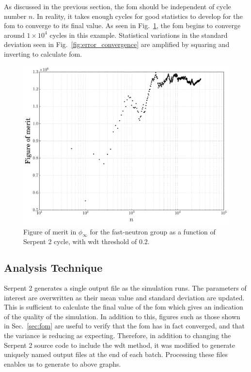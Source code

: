 As discussed in the previous section, the \gls{fom} should be
independent of cycle number $n$. In reality, it takes enough cycles
for good statistics to develop for the \gls{fom} to converge to its
final value. As seen in Fig.~\ref{fig:fom_convergence}, the \gls{fom}
begins to converge around $1\times 10^4$ cycles in this example. Statistical
variations in the standard deviation seen in
Fig.~\ref{fig:error_convergence} are amplified by squaring and
inverting to calculate \gls{fom}.
\begin{figure}[hbtp]
  \centering
  \includegraphics[scale=0.5]{images/fom_convergence_example}
  \caption[Figure of merit in $\phi_{\infty}$ for the fast-neutron group as a
    function of Serpent 2 cycle.]{Figure of merit in $\phi_{\infty}$ for the fast-neutron group as a
    function of Serpent 2 cycle, with \gls{wdt} threshold of 0.2.}
  \label{fig:fom_convergence}
\end{figure}

\subsection{Analysis Technique}
\label{sec:analysis}

Serpent 2 generates a single output file as the simulation runs. The
parameters of interest are overwritten as their mean value and
standard deviation are updated. This is sufficient to calculate the
final value of the \gls{fom} which gives an indication of the quality
of the simulation. In addition to this, figures such as those shown in
Sec.~\ref{sec:fom} are useful to verify that the \gls{fom} has in fact
converged, and that the variance is reducing as expecting. Therefore,
in addition to changing the Serpent 2 source code to include the
\gls{wdt} method, it was modified to generate uniquely named output
files at the end of each batch. Processing these files enables us to
generate to above graphs.

